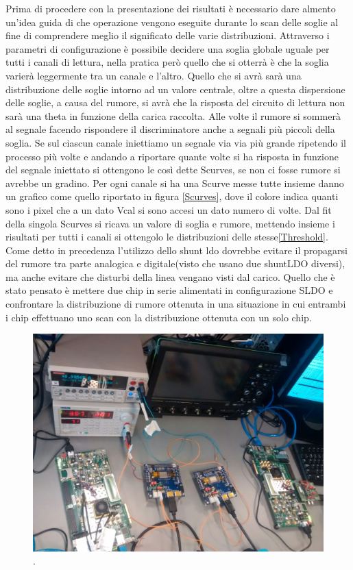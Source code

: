 Prima di procedere con la presentazione dei risultati è necessario dare almento un'idea guida di che operazione vengono eseguite durante lo scan delle soglie al fine di comprendere meglio il significato delle varie distribuzioni.
Attraverso i parametri di configurazione è possibile decidere una soglia globale uguale per tutti i canali di lettura, nella pratica però quello che si otterrà è che la soglia varierà leggermente tra un canale e l'altro. 
Quello che si avrà sarà una distribuzione delle soglie intorno ad un valore centrale, oltre a questa dispersione delle soglie, a causa del rumore, si avrà che la risposta del circuito di lettura non sarà una theta in funzione della carica raccolta. 
Alle volte il rumore si sommerà al segnale facendo rispondere il discriminatore anche a segnali più piccoli della soglia. Se sul ciascun canale iniettiamo un segnale via via più grande ripetendo il processo più volte e andando a riportare quante volte si ha risposta in funzione del segnale iniettato si ottengono le così dette Scurves, se non ci fosse rumore si avrebbe un gradino. 
Per ogni canale si ha una Scurve messe tutte insieme danno un grafico come quello riportato in figura \ref{Scurves}, dove il colore indica quanti sono i pixel che a un dato Vcal si sono accesi un dato numero di volte. Dal fit della singola Scurves si ricava un valore di soglia e rumore, mettendo insieme i risultati per tutti i canali si ottengolo le distribuzioni delle stesse\ref{Threshold}. 
Come detto in precedenza l'utilizzo dello shunt ldo dovrebbe evitare il propagarsi del rumore tra parte analogica e digitale(visto che usano due shuntLDO diversi), ma anche evitare che disturbi della linea vengano visti dal carico. Quello che è stato pensato è mettere due chip in serie alimentati in configurazione SLDO e confrontare la distribuzione di rumore ottenuta in una situazione in cui entrambi i chip effettuano uno scan con la distribuzione ottenuta con un solo chip. 
\begin{figure}
\centering
\includegraphics[scale=.2]{Immagini/chipserial}
\caption{.}
\label{chipserial}
\end{figure}
